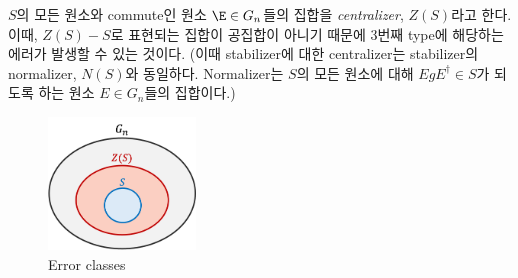 $S$의 모든 원소와 commute인 원소 $\E \in G_n$들의 집합을 \textit{centralizer}, $Z(S)$라고 한다. 이때, $Z(S) - S$로 표현되는 집합이 공집합이 아니기 때문에 3번째 type에 해당하는 에러가 발생할 수 있는 것이다. (이때 stabilizer에 대한 centralizer는 stabilizer의 normalizer, $N(S)$와 동일하다. Normalizer는 $S$의 모든 원소에 대해 $EgE^\dagger \in S$가 되도록 하는 원소 $E \in G_n$들의 집합이다.)

\begin{figure}[h]
    \centering
    \includegraphics[width=0.35\textwidth]{figures/C7_error_class.png}
    \caption{Error classes}
\end{figure}

\pagebreak

